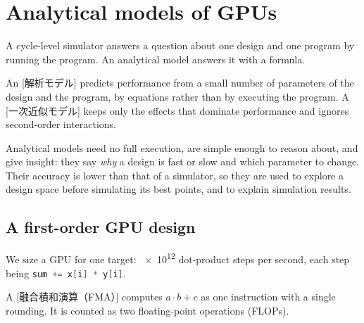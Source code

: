\documentclass[../main.tex]{subfiles}
\begin{document}
\section{Analytical models of GPUs}
\label{sec:l08-analytical}

A cycle-level simulator answers a question about one design and one
program by running the program.
An analytical model answers it with a formula.

\begin{definition}
  \label{def:l08-analytical-model}
  An [解析モデル] predicts performance from a
  small number of parameters of the design and the program, by
  equations rather than by executing the program.  A
  [一次近似モデル] keeps only the effects that
  dominate performance and ignores second-order interactions.
\end{definition}

Analytical models need no full execution, are simple enough to
reason about, and give insight: they say \emph{why} a design is fast or
slow and which parameter to change.  Their accuracy is lower than that
of a simulator, so they are used to explore a design space before
simulating its best points, and to explain simulation results.

\subsection{A first-order GPU design}

We size a GPU for one target: \num{e12} dot-product steps per second,
each step being \lstinline[language=C++]!sum += x[i] * y[i]!.

\begin{definition}
  \label{def:l08-fma}
  A [融合積和演算（FMA）] computes
  $a \cdot b + c$ as one instruction with a single rounding.  It is
  counted as two floating-point operations (FLOPs).
\end{definition}
\end{document}
